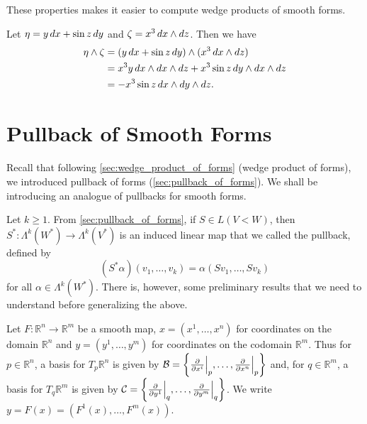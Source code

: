 \documentclass[notoc,notitlepage]{tufte-book}
\begin{document}
These properties makes it easier to compute wedge products of smooth forms.

\begin{eg}
  Let $\eta = y \mathop{}\!d{x} + \sin z \mathop{}\!d{y}$ and $\zeta = x^3 \mathop{}\!d{x} \land \mathop{}\!d{z}$. Then we have
  \begin{align*}
    \eta \land \zeta &= (y \dif{x} + \sin z \dif{y}) \land (x^3 \dif{x} \land \dif{z}) \\
                     &= x^3 y \dif{x} \land \dif{x} \land \dif{z} 
                      + x^3 \sin z \dif{y} \land \dif{x} \land \dif{z} \\
                     &= - x^3 \sin z \dif{x} \land \dif{y} \land \dif{z}.
  \end{align*}
\end{eg}


\section{Pullback of Smooth Forms}%
\label{sec:pullback_of_smooth_forms}

Recall that following \cref{sec:wedge_product_of_forms} (wedge product of forms), we introduced
pullback of forms (\cref{sec:pullback_of_forms}). We shall be introducing an analogue of pullbacks
for smooth forms.

Let $k \geq 1$. From \cref{sec:pullback_of_forms}, if $S \in L(V< W)$, then $S^* : \Lambda^k(W^*)
\to \Lambda^k(V^*)$ is an induced linear map that we called the pullback, defined by
\begin{equation}\label{eq:normal_pullback_as_guide}
  (S^* \alpha)(v_1, \ldots, v_k) = \alpha(Sv_1, \ldots, Sv_k)
\end{equation}
for all $\alpha \in \Lambda^k(W^*)$. There is, however, some preliminary results that we need to
understand before generalizing the above.

Let $F : \mathbb{R}^n \to \mathbb{R}^m$ be a smooth map, $x = (x^1, \ldots, x^n)$ for coordinates
on the domain $\mathbb{R}^n$ and $y = (y^1, \ldots, y^m)$ for coordinates on the codomain
$\mathbb{R}^m$. Thus for $p \in \mathbb{R}^n$, a basis for $T_p \mathbb{R}^n$ is given by
$\mathcal{B} = \left\{ \frac{\partial}{\partial x^i}\Big|_{p}^{}, \ldots,
\frac{\partial}{\partial x^n}\Big|_{p}^{} \right\}$ and, for $q \in \mathbb{R}^m$, a basis for $T_q
\mathbb{R}^m$ is given by $\mathcal{C} = \left\{ \frac{\partial}{\partial y^1}\Big|_{q}^{},
\ldots, \frac{\partial}{\partial y^m}\Big|_{q}^{} \right\}$. We write $y = F(x) = (F^1(x), \ldots,
F^m(x))$.
\end{document}
